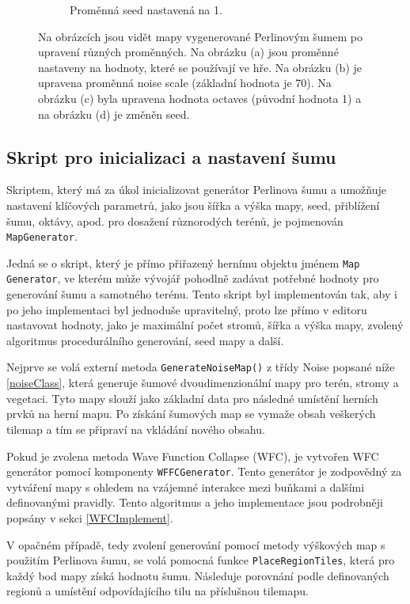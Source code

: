 \begin{figure}[H]
\begin{subfigure}{0.475\textwidth}
		\caption{Proměnná seed nastavená na 1.}
		\label{NoiseSeed}
	\end{subfigure}
	\caption{Na obrázcích jsou vidět mapy vygenerované Perlinovým šumem po upravení různých proměnných. Na obrázku (a) jsou proměnné nastaveny na hodnoty, které se používají ve hře. Na obrázku (b) je upravena proměnná noise scale (základní hodnota je 70). Na obrázku (c) byla upravena hodnota octaves (původní hodnota 1) a na obrázku (d) je změněn seed.}
	\label{NoiseScale}
\end{figure}

\subsection{Skript pro inicializaci a nastavení šumu}
Skriptem, který má za úkol inicializovat generátor Perlinova šumu a umožňuje nastavení klíčových parametrů, jako jsou šířka a výška mapy, seed, přiblížení šumu, oktávy, apod. pro dosažení různorodých terénů, je pojmenován \texttt{MapGenerator}. 

Jedná se o skript, který je přímo přiřazený hernímu objektu jménem \texttt{Map Generator}, ve kterém může vývojář pohodlně zadávat potřebné hodnoty pro generování šumu a samotného terénu. Tento skript byl implementován tak, aby i po jeho implementaci byl jednoduše upravitelný, proto lze přímo v editoru nastavovat hodnoty, jako je maximální počet stromů, šířka a výška mapy, zvolený algoritmus procedurálního generování, seed mapy a další.

Nejprve se volá externí metoda \texttt{GenerateNoiseMap()} z třídy Noise popsané níže \ref{noiseClass}, která generuje šumové dvoudimenzionální mapy pro terén, stromy a vegetaci. Tyto mapy slouží jako základní data pro následné umístění herních prvků na herní mapu. Po získání šumových map se vymaže obsah veškerých tilemap a tím se připraví na vkládání nového obsahu.

Pokud je zvolena metoda Wave Function Collapse (WFC), je vytvořen WFC generátor pomocí komponenty \texttt{WFFCGenerator}. Tento generátor je zodpovědný za vytváření mapy s ohledem na vzájemné interakce mezi buňkami a dalšími definovanými pravidly. Tento algoritmus a jeho implementace jsou podrobněji popsány v sekci \ref{WFCImplement}.

V opačném případě, tedy zvolení generování pomocí metody výškových map s použitím Perlinova šumu, se volá pomocná funkce \texttt{PlaceRegionTiles}, která pro každý bod mapy získá hodnotu šumu. Následuje porovnání podle definovaných regionů a umístění odpovídajícího tilu na příslušnou tilemapu.

